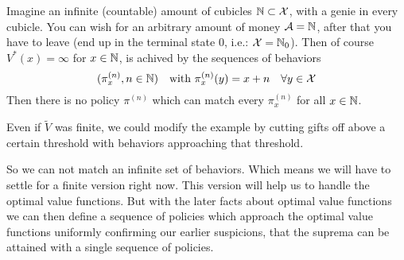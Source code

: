 \begin{example} \label{genie cubicles}
Imagine an infinite (countable) amount of cubicles \(\mathbb{N} \subset \mathcal{X}\), with a genie in every cubicle. You can wish for an arbitrary amount of money \(\mathcal{A}=\mathbb{N}\), after that you have to leave (end up in the terminal state \(0\), i.e.: \(\mathcal{X}=\mathbb{N}_0\)). Then of course \(V^*(x)=\infty\) for \(x\in\mathbb{N}\), is achived by the sequences of behaviors 
\[
	(\pi_x^{(n)}, n\in\mathbb{N})\quad  \text{with } \pi_x^{(n)}(y)=x+n\quad \forall y\in\mathcal{X}
\]
Then there is no policy \(\pi^{(n)}\) which can match every \(\pi_x^{(n)}\) for all \(x\in\mathbb{N}\).

Even if \(\tilde{V}\) was finite, we could modify the example by cutting gifts off above a certain threshold with behaviors approaching that threshold. 
\end{example}

So we can not match an infinite set of behaviors. Which means we will have to settle for a finite version right now. This version will help us to handle the optimal value functions. But with the later facts about optimal value functions we can then define a sequence of policies which approach the optimal value functions uniformly confirming our earlier suspicions, that the suprema can be attained with a single sequence of policies. 

